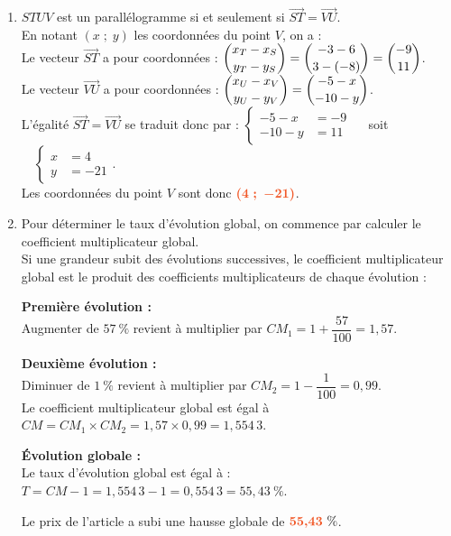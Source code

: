 \documentclass[a4paper,11pt]{article}
\begin{document}
\begin{seanceD}{}
\begin{enumerate}
\item  $STUV$ est un parallélogramme si et seulement si $\overrightarrow{ST} = \overrightarrow{VU}$.\\En notant $(x\;;\;y)$ les coordonnées du point $V$, on a :\\Le vecteur $\overrightarrow{ST}$ a pour coordonnées : $\dbinom{x_T - x_S}{y_T - y_S }=\dbinom{-3-6}{3-(-8)} = \dbinom{-9}{11}$.\\Le vecteur $\overrightarrow{VU}$ a pour coordonnées : $\dbinom{x_U - x_V}{y_U - y_V }=\dbinom{-5 - x}{-10 - y}$.\\L'égalité $\overrightarrow{ST} = \overrightarrow{VU}$ se traduit donc par : $\begin{cases}-5 - x &= -9 \\ -10 - y &= 11\end{cases}\quad$ soit $\quad\begin{cases}x &= 4 \\ y &= -21\end{cases}$.\\Les coordonnées du point $V$ sont donc ${\color[HTML]{f15929}\boldsymbol{(4\;;\;-21)}}$.

\item Pour déterminer le taux d'évolution global, on commence par calculer le coefficient multiplicateur global.\\Si une grandeur subit des évolutions successives, le coefficient multiplicateur global est le produit des coefficients multiplicateurs de chaque évolution :

\medskip
\textbf{Première évolution :} \\
          Augmenter de $57~\%$ revient à multiplier par $CM_1 = 1 + \dfrac{57}{100} = 1{,}57$.

\medskip
\textbf{Deuxième évolution :}\\ Diminuer de $1~\%$ revient à multiplier par $CM_2 = 1 - \dfrac{1}{100} = 0{,}99$.\\Le coefficient multiplicateur global est égal à $CM = CM_1 \times CM_2 = 1{,}57 \times 0{,}99 =1{,}554\,3$.

\medskip
\textbf{Évolution globale :}\\
          Le taux d'évolution global est égal à : $T=CM-1=1{,}554\,3-1=0{,}554\,3=55{,}43~\%$.

\medskip
Le prix de l'article a subi une hausse globale de ${\color[HTML]{f15929}\boldsymbol{55{,}43}}~\%$.

\end{enumerate}

\end{seanceD}
\end{document}
